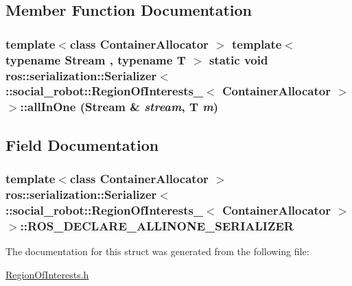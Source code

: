 \subsection{Member Function Documentation}
\hypertarget{structros_1_1serialization_1_1Serializer_3_01_1_1social__robot_1_1RegionOfInterests___3_01ContainerAllocator_01_4_01_4_aa0bac552a1bd0f861cf8799a39d5e0df}{
\subsubsection[{allInOne}]{\setlength{\rightskip}{0pt plus 5cm}template$<$class ContainerAllocator $>$ template$<$typename Stream , typename T $>$ static void ros::serialization::Serializer$<$ ::{\bf social\_\-robot::RegionOfInterests\_\-}$<$ ContainerAllocator $>$ $>$::allInOne (Stream \& {\em stream}, \/  T {\em m})}}
\label{structros_1_1serialization_1_1Serializer_3_01_1_1social__robot_1_1RegionOfInterests___3_01ContainerAllocator_01_4_01_4_aa0bac552a1bd0f861cf8799a39d5e0df}


\subsection{Field Documentation}
\hypertarget{structros_1_1serialization_1_1Serializer_3_01_1_1social__robot_1_1RegionOfInterests___3_01ContainerAllocator_01_4_01_4_aea3e7ff08267371e6c24a0748eec1170}{
\subsubsection[{ROS\_\-DECLARE\_\-ALLINONE\_\-SERIALIZER}]{\setlength{\rightskip}{0pt plus 5cm}template$<$class ContainerAllocator $>$ ros::serialization::Serializer$<$ ::{\bf social\_\-robot::RegionOfInterests\_\-}$<$ ContainerAllocator $>$ $>$::{\bf ROS\_\-DECLARE\_\-ALLINONE\_\-SERIALIZER}}}
\label{structros_1_1serialization_1_1Serializer_3_01_1_1social__robot_1_1RegionOfInterests___3_01ContainerAllocator_01_4_01_4_aea3e7ff08267371e6c24a0748eec1170}


The documentation for this struct was generated from the following file:\begin{DoxyCompactItemize}
\item 
\hyperlink{RegionOfInterests_8h}{RegionOfInterests.h}\end{DoxyCompactItemize}

